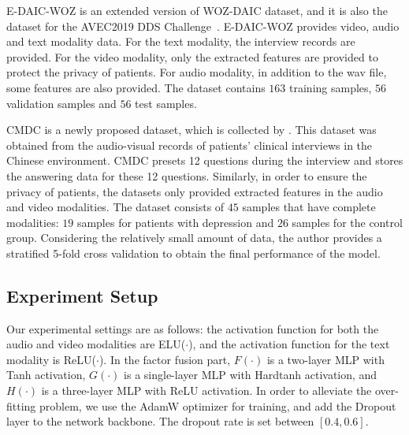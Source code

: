 \documentclass{article}
\begin{document}
E-DAIC-WOZ is an extended version of WOZ-DAIC dataset\cite{DAIC}, and it is also the dataset for the AVEC2019 DDS Challenge~\cite{AVEC2019}.
E-DAIC-WOZ provides video, audio and text modality data. For the text modality, the interview records are provided. For the video modality, only the extracted features are provided to protect the privacy of patients. For audio modality, in addition to the wav file, some features are also provided.
The dataset contains $163$ training samples, $56$ validation samples and $56$ test samples.

CMDC is a newly proposed dataset, which is collected by \cite{CMDC}.
This dataset was obtained from the audio-visual records of patients' clinical interviews in the Chinese environment.
CMDC presets 12 questions during the interview and stores the answering data for these 12 questions.
Similarly, in order to ensure the privacy of patients, the datasets only provided extracted features in the audio and video modalities.
The dataset consists of $45$ samples that have complete modalities: $19$ samples for patients with depression and $26$ samples for the control group. Considering the relatively small amount of data, the author provides a stratified 5-fold cross validation to obtain the final performance of the model.

\subsection{Experiment Setup}
Our experimental settings are as follows: the activation function for both the audio and video modalities are ELU($\cdot$), and the activation function for the text modality is ReLU($\cdot$). In the factor fusion part, $F(\cdot)$ is a two-layer MLP with Tanh activation, $G(\cdot)$ is a single-layer MLP with Hardtanh activation, and $H(\cdot)$ is a three-layer MLP with ReLU activation.
In order to alleviate the over-fitting problem, we use the AdamW optimizer for training, and add the Dropout layer to the network backbone. The dropout rate is set between $[0.4,0.6]$.
\end{document}
